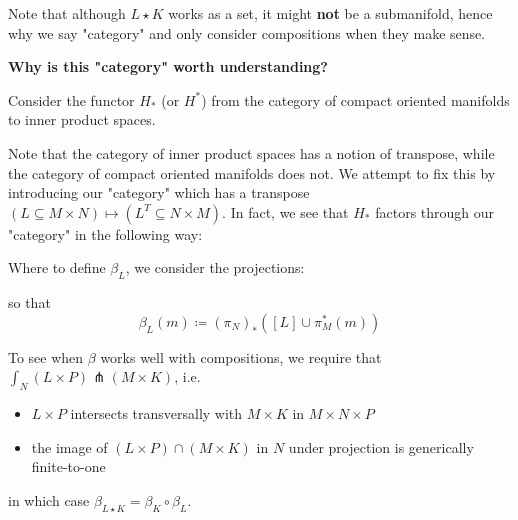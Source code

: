 \documentclass[12pt]{amsart}
\numberwithin{equation}{section}
\theoremstyle{definition}
\numberwithin{figure}{section}
\newcommand{\Hom}{\operatorname{Hom}}
\begin{document}
Note that although $L\star K$ works as a set, it might \textbf{not} be a submanifold, hence why we say "category" and only consider compositions when they make sense.

\textbf{Why is this "category" worth understanding?}

Consider the functor $H_*$ (or $H^*$) from the category of compact oriented manifolds to inner product spaces.

Note that the category of inner product spaces has a notion of transpose, while the category of compact oriented manifolds does not. We attempt to fix this by introducing our "category" which has a transpose $(L \subseteq M\times N) \mapsto (L^T \subseteq N\times M)$. In fact, we see that $H_*$ factors through our "category" in the following way:

\begin{center}
\end{center}

Where to define $\beta_L$, we consider the projections:
\begin{center}
\end{center}
so that
\[
	\beta_L(m) \coloneqq (\pi_N)_*([L] \cup \pi_M^*(m))
\]

To see when $\beta$ works well with compositions, we require that $\int_N (L\times P) \pitchfork (M\times K)$, i.e.
\begin{itemize}
	\item $L\times P$ intersects transversally with $M\times K$ in $M\times N\times P$
	\item the image of $(L\times P) \cap (M\times K)$ in $N$ under projection is generically finite-to-one
\end{itemize}
in which case $\beta_{L \star K} = \beta_{K} \circ \beta_{L}$.
\end{document}
